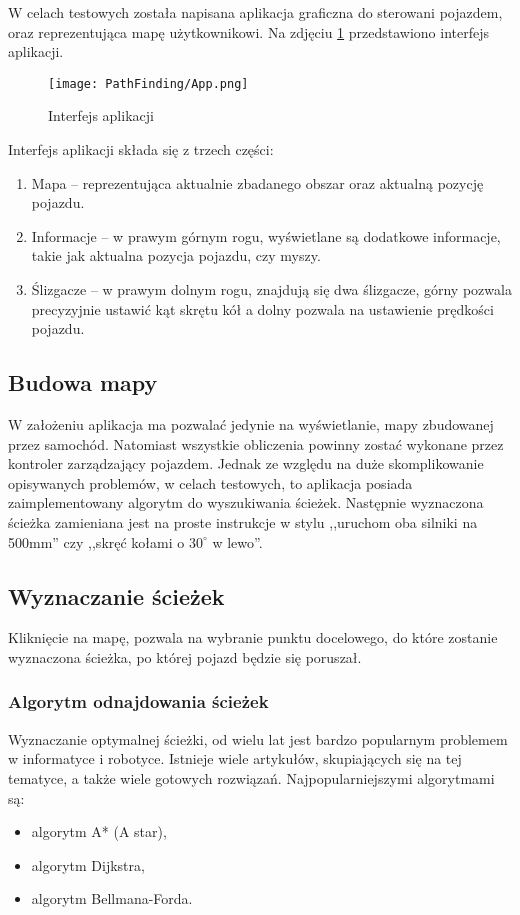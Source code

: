     W celach testowych została napisana aplikacja graficzna do sterowani pojazdem, oraz reprezentująca mapę użytkownikowi.
    Na zdjęciu \ref{fig:app} przedstawiono interfejs aplikacji.
    \begin{figure}[!ht]
        \centering
        \texttt{[image: PathFinding/App.png]}
        \caption{Interfejs aplikacji}
        \label{fig:app}
    \end{figure}
    Interfejs aplikacji składa się z trzech części:
    \begin{enumerate}
        \item Mapa -- reprezentująca aktualnie zbadanego obszar oraz aktualną pozycję pojazdu.
        \item Informacje -- w prawym górnym rogu, wyświetlane są dodatkowe informacje, takie jak aktualna pozycja pojazdu, czy myszy.
        \item Ślizgacze -- w prawym dolnym rogu, znajdują się dwa ślizgacze, górny pozwala precyzyjnie ustawić kąt skrętu kół a dolny pozwala na ustawienie prędkości pojazdu.
    \end{enumerate}

    \subsection{Budowa mapy}
        W założeniu aplikacja ma pozwalać jedynie na wyświetlanie, mapy zbudowanej przez samochód.
        Natomiast wszystkie obliczenia powinny zostać wykonane przez kontroler zarządzający pojazdem.
        Jednak ze względu na duże skomplikowanie opisywanych problemów, w celach testowych, to aplikacja posiada zaimplementowany algorytm do wyszukiwania ścieżek.
        Następnie wyznaczona ścieżka zamieniana jest na proste instrukcje w stylu ,,uruchom oba silniki na 500mm'' czy ,,skręć kołami o $30^\circ$ w lewo''.
        



    \subsection{Wyznaczanie ścieżek}
        Kliknięcie na mapę, pozwala na wybranie punktu docelowego, do które zostanie wyznaczona ścieżka, po której pojazd będzie się poruszał.

        \subsubsection{Algorytm odnajdowania ścieżek}
            Wyznaczanie optymalnej ścieżki, od wielu lat jest bardzo popularnym problemem w informatyce i robotyce.
            Istnieje wiele artykułów, skupiających się na tej tematyce, a także wiele gotowych rozwiązań.
            Najpopularniejszymi algorytmami są:
            \begin{itemize}
                \item algorytm A* (A star),
                \item algorytm Dijkstra,
                \item algorytm Bellmana-Forda.
            \end{itemize}

